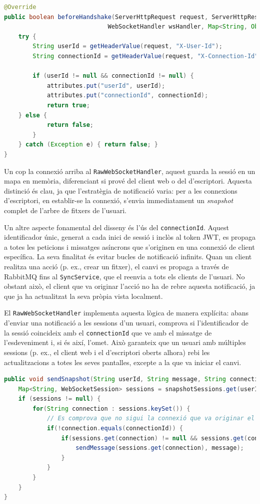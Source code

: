 \begin{lstlisting}[language=Java, caption={Interceptor per extreure IDs d'usuari a `UserIdHandshakeInterceptor`}]
@Override
public boolean beforeHandshake(ServerHttpRequest request, ServerHttpResponse response, 
                             WebSocketHandler wsHandler, Map<String, Object> attributes) throws Exception {
    try {
        String userId = getHeaderValue(request, "X-User-Id");
        String connectionId = getHeaderValue(request, "X-Connection-Id");
        
        if (userId != null && connectionId != null) {
            attributes.put("userId", userId);
            attributes.put("connectionId", connectionId);
            return true;
    } else {
            return false;
        }
    } catch (Exception e) { return false; }
}
\end{lstlisting}

Un cop la connexió arriba al \texttt{RawWebSocketHandler}, aquest guarda la sessió en un mapa en memòria, diferenciant si prové del client web o del d'escriptori. Aquesta distinció és clau, ja que l'estratègia de notificació varia: per a les connexions d'escriptori, en establir-se la connexió, s'envia immediatament un \textit{snapshot} complet de l'arbre de fitxers de l'usuari.

Un altre aspecte fonamental del disseny és l'ús del \texttt{connectionId}. Aquest identificador únic, generat a cada inici de sessió i inclòs al token JWT, es propaga a totes les peticions i missatges asíncrons que s'originen en una connexió de client específica. La seva finalitat és evitar bucles de notificació infinits. Quan un client realitza una acció (p. ex., crear un fitxer), el canvi es propaga a través de RabbitMQ fins al \texttt{SyncService}, que el reenvia a tots els clients de l'usuari. No obstant això, el client que va originar l'acció no ha de rebre aquesta notificació, ja que ja ha actualitzat la seva pròpia vista localment.

El \texttt{RawWebSocketHandler} implementa aquesta lògica de manera explícita: abans d'enviar una notificació a les sessions d'un usuari, comprova si l'identificador de la sessió coincideix amb el \texttt{connectionId} que ve amb el missatge de l'esdeveniment i, si és així, l'omet. Això garanteix que un usuari amb múltiples sessions (p. ex., el client web i el d'escriptori oberts alhora) rebi les actualitzacions a totes les seves pantalles, excepte a la que va iniciar el canvi.

\begin{lstlisting}[language=Java, caption={Exclusió de la connexió origen a `RawWebSocketHandler`}]
public void sendSnapshot(String userId, String message, String connectionId) throws IOException {
    Map<String, WebSocketSession> sessions = snapshotSessions.get(userId);
    if (sessions != null) {
        for(String connection : sessions.keySet()) {
            // Es comprova que no sigui la connexió que va originar el canvi
            if(!connection.equals(connectionId)) {
                if(sessions.get(connection) != null && sessions.get(connection).isOpen()) {
                    sendMessage(sessions.get(connection), message);
                }
            }
        }
    }
}
\end{lstlisting}

